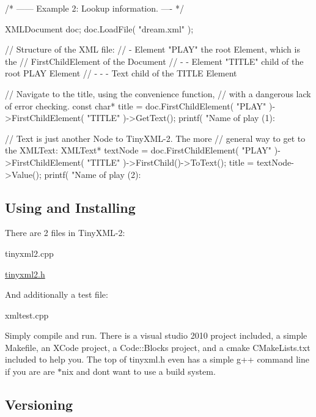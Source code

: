 \begin{DoxyVerb}/* ------ Example 2: Lookup information. ---- */    
{
    XMLDocument doc;
    doc.LoadFile( "dream.xml" );

    // Structure of the XML file:
    // - Element "PLAY"      the root Element, which is the 
    //                       FirstChildElement of the Document
    // - - Element "TITLE"   child of the root PLAY Element
    // - - - Text            child of the TITLE Element

    // Navigate to the title, using the convenience function,
    // with a dangerous lack of error checking.
    const char* title = doc.FirstChildElement( "PLAY" )->FirstChildElement( "TITLE" )->GetText();
    printf( "Name of play (1): %

    // Text is just another Node to TinyXML-2. The more
    // general way to get to the XMLText:
    XMLText* textNode = doc.FirstChildElement( "PLAY" )->FirstChildElement( "TITLE" )->FirstChild()->ToText();
    title = textNode->Value();
    printf( "Name of play (2): %
}
\end{DoxyVerb}


\subsection*{Using and Installing }

There are 2 files in Tiny\+X\+M\+L-\/2\+:
\begin{DoxyItemize}
\item tinyxml2.\+cpp
\item \hyperlink{tinyxml2_8h_source}{tinyxml2.\+h}
\end{DoxyItemize}

And additionally a test file\+:
\begin{DoxyItemize}
\item xmltest.\+cpp
\end{DoxyItemize}

Simply compile and run. There is a visual studio 2010 project included, a simple Makefile, an X\+Code project, a Code\+::\+Blocks project, and a cmake C\+Make\+Lists.\+txt included to help you. The top of tinyxml.\+h even has a simple g++ command line if you are are $\ast$nix and don\textquotesingle{}t want to use a build system.

\subsection*{Versioning }


